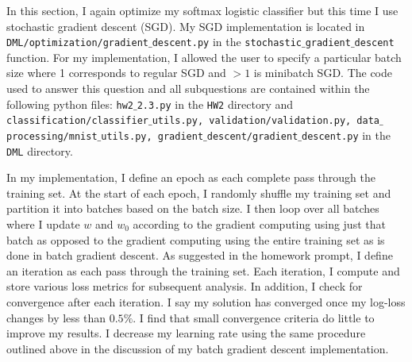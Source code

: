 \documentclass[12pt]{amsart}
\begin{document}
In this section, I again optimize my softmax logistic classifier but this time I use stochastic gradient descent (SGD).  My SGD implementation is located in {\tt DML/optimization/gradient$\_$descent.py} in the {\tt stochastic$\_$gradient$\_$descent} function.  For my implementation, I allowed the user to specify a particular batch size where 1 corresponds to regular SGD and $> 1$ is minibatch SGD.  The code used to answer this question and all subquestions are contained within the following python files: {\tt hw2$\_$2.3.py} in the {\tt HW2} directory and {\tt classification/classifier$\_$utils.py, validation/validation.py, data$\_$processing/mnist$\_$utils.py, gradient$\_$descent/gradient$\_$descent.py} in the {\tt DML} directory.

In my implementation, I define an epoch as each complete pass through the training set.  At the start of each epoch, I randomly shuffle my training set and partition it into batches based on the batch size.  I then loop over all batches where I update $w$ and $w_0$ according to the gradient computing using just that batch as opposed to the gradient computing using the entire training set as is done in batch gradient descent.  As suggested in the homework prompt, I define an iteration as each pass through the training set.  Each iteration, I compute and store various loss metrics for subsequent analysis.  In addition, I check for convergence after each iteration.  I say my solution has converged once my log-loss changes by less than $0.5\%$.  I find that small convergence criteria do little to improve my results.  I decrease my learning rate using the same procedure outlined above in the discussion of my batch gradient descent implementation.
\end{document}
